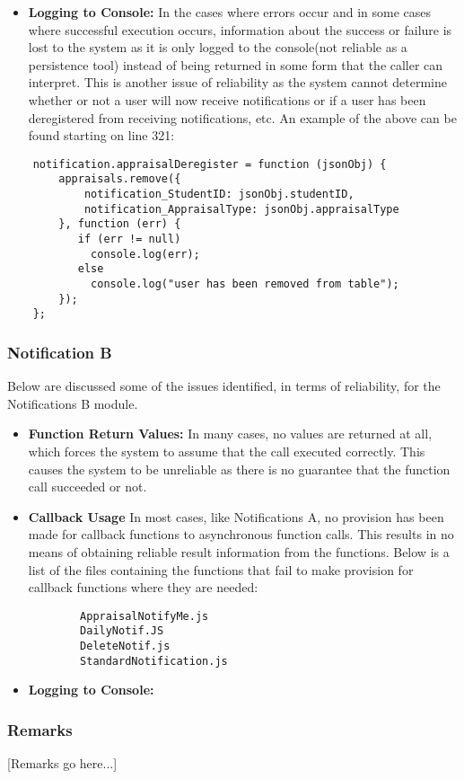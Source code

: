 \begin{itemize}
\item \textbf{Logging to Console:}\newline
     In the cases where errors occur and in some cases where successful execution occurs, information about the success or failure is lost to the system as it is only logged to the console(not reliable as a persistence tool) instead of being returned in some form that the caller can interpret. This is another issue of reliability as the system cannot determine whether or not a user will now receive notifications or if a user has been deregistered from receiving notifications, etc.
     An example of the above can be found starting on line 321: 
\end{itemize}
\begin{lstlisting}
    notification.appraisalDeregister = function (jsonObj) {
        appraisals.remove({
            notification_StudentID: jsonObj.studentID,
            notification_AppraisalType: jsonObj.appraisalType
        }, function (err) {
           if (err != null)
             console.log(err);
           else
             console.log("user has been removed from table");
        });
    };
\end{lstlisting}

\subsubsection*{Notification B}
Below are discussed some of the issues identified, in terms of reliability, for the Notifications B module.
\begin{itemize}
	\item \textbf{Function Return Values:}\newline
	In many cases, no values are returned at all, which forces the system to assume that the call executed correctly. This causes the system to be unreliable as there is no guarantee that the function call succeeded or not.
	\item \textbf{Callback Usage}\newline
	In most cases, like Notifications A, no provision has been made for callback functions to asynchronous function calls. This results in no means of obtaining reliable result information from the functions. Below is a list of the files containing the functions that fail to make provision for callback functions where they are needed:
		\begin{lstlisting}
		AppraisalNotifyMe.js
		DailyNotif.JS
		DeleteNotif.js
		StandardNotification.js
		\end{lstlisting}
	\item \textbf{Logging to Console:}\newline
\end{itemize}
\subsubsection*{Remarks}
[Remarks go here...]